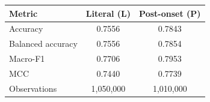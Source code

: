 


\begin{tabular}{lcc}
\toprule
Metric & Literal (L) & Post-onset (P)\\
\midrule
Accuracy & 0.7556 & 0.7843\\
Balanced accuracy & 0.7556 & 0.7854\\
Macro-F1 & 0.7706 & 0.7953\\
MCC & 0.7440 & 0.7739\\
Observations & 1,050,000 & 1,010,000\\
\bottomrule
\end{tabular}
